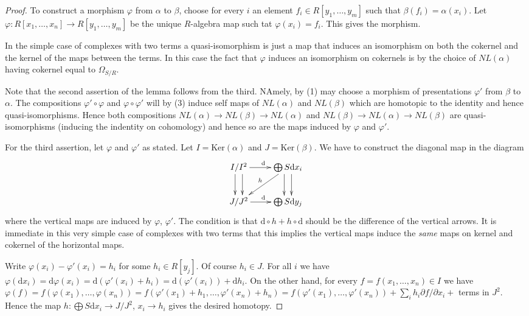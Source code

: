 \begin{proof}
To construct a morphism $\varphi$ from $\alpha$ to $\beta$, choose
for every $i$ an element $f_i \in R[y_1, \ldots, y_m]$
such that $\beta(f_i) = \alpha(x_i)$. Let
$\varphi : R[x_1,\ldots,x_n] \to R[y_1,\ldots,y_m]$ be the
unique $R$-algebra map such tat $\varphi(x_i) = f_i$.
This gives the morphism.

\medskip\noindent
In the simple case of complexes with two terms a quasi-isomorphism
is just a map that induces an isomorphism on both the cokernel
and the kernel of the maps between the terms. In this case the
fact that $\varphi$ induces an isomorphism on cokernels is by
the choice of $NL(\alpha)$ having cokernel equal to $\Omega_{S/R}$.

\medskip\noindent
Note that the second assertion of the lemma follows from the third.
NAmely, by (1) may choose a morphism of presentations
$\varphi'$ from $\beta$ to $\alpha$. The compositions
$\varphi' \circ \varphi$ and $\varphi \circ \varphi'$
will by (3) induce self maps of $NL(\alpha)$ and $NL(\beta)$
which are homotopic to the identity and hence quasi-isomorphisms.
Hence both compositions $NL(\alpha) \to NL(\beta) \to NL(\alpha)$
and $NL(\beta) \to NL(\alpha) \to NL(\beta)$ are quasi-isomorphisms
(inducing the indentity on cohomology) and hence so are the maps induced
by $\varphi$ and $\varphi'$.

\medskip\noindent
For the third assertion, let $\varphi$ and $\varphi'$ as stated.
Let $I = \text{Ker}(\alpha)$ and $J = \text{Ker}(\beta)$.
We have to construct the diagonal map in the diagram
$$
\xymatrix{
I/I^2 \ar[r]^{\text{d}} \ar@<1ex>[d] \ar@<-1ex>[d]
&
\bigoplus S\text{d}x_i \ar@<1ex>[d] \ar@<-1ex>[d] \ar[ld]_h
\\
J/J^2 \ar[r]^{\text{d}}
&
\bigoplus S\text{d}y_j
}
$$
where the vertical maps are induced by $\varphi$, $\varphi'$.
The condition is that $\text{d} \circ h + h \circ \text{d}$ should be
the difference of the vertical arrows. It is immediate in this
very simple case of complexes with two terms that this implies 
the vertical maps induce the {\it same} maps on kernel and cokernel
of the horizontal maps.

\medskip\noindent
Write $\varphi(x_i) - \varphi'(x_i) = h_i$ for some
$h_i \in R[y_j]$. Of course $h_i \in J$. For all $i$ we have
$\varphi(\text{d}x_i) = \text{d}\varphi(x_i)
=\text{d}(\varphi'(x_i) + h_i) =
\text{d}(\varphi'(x_i)) + \text{d}h_i$. On the other hand,
for every $f = f(x_1,\ldots,x_n) \in I$ we have $\varphi(f) = 
f(\varphi(x_1),\ldots, \varphi(x_n)) =
f(\varphi'(x_1) + h_1,\ldots, \varphi'(x_n) + h_n) =
f(\varphi'(x_1),\ldots, \varphi'(x_n)) + 
\sum_i h_i \partial f/\partial x_i + $ terms in 
$J^2$. Hence the map $h : \bigoplus S\text{d}x_i \to J/J^2$,
$x_i \to h_i$ gives the desired homotopy.
\end{proof}


